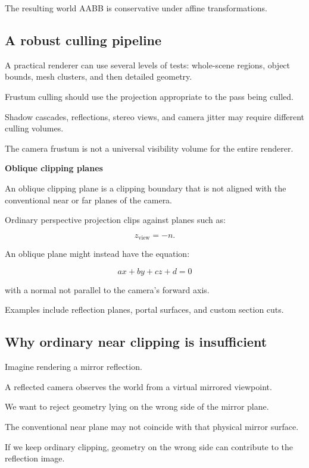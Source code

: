 The resulting world AABB is conservative under affine transformations.

\subsection{A robust culling pipeline}\label{02-foundations-ii-ch034-a-robust-culling-pipeline}

A practical renderer can use several levels of tests: whole-scene regions, object bounds, mesh clusters, and then detailed geometry.

Frustum culling should use the projection appropriate to the pass being culled.

Shadow cascades, reflections, stereo views, and camera jitter may require different culling volumes.

The camera frustum is not a universal visibility volume for the entire renderer.

\textbf{Oblique clipping planes}

An oblique clipping plane is a clipping boundary that is not aligned with the conventional near or far planes of the camera.

Ordinary perspective projection clips against planes such as:

\[
 z_{\mathrm{view}}=-n.
\]

An oblique plane might instead have the equation:

\[
 \boxed{ ax+by+cz+d=0 }
\]

with a normal not parallel to the camera's forward axis.

Examples include reflection planes, portal surfaces, and custom section cuts.

\subsection{Why ordinary near clipping is insufficient}\label{02-foundations-ii-ch034-why-ordinary-near-clipping-is-insufficient}

Imagine rendering a mirror reflection.

A reflected camera observes the world from a virtual mirrored viewpoint.

We want to reject geometry lying on the wrong side of the mirror plane.

The conventional near plane may not coincide with that physical mirror surface.

If we keep ordinary clipping, geometry on the wrong side can contribute to the reflection image.

